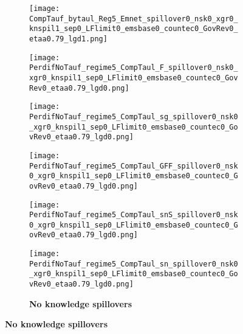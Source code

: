  \begin{figure}[h!!]
	\centering
	\caption{Effect of a constant carbon tax in model variations }\label{fig:Leveltauf_nsk0_xgr0_noknow}	
	\begin{subfigure}{0.75\textwidth}
		\caption{\textbf{No knowledge spillovers}}
	\begin{minipage}[]{0.32\textwidth}
	\texttt{[image: CompTauf\_bytaul\_Reg5\_Emnet\_spillover0\_nsk0\_xgr0\_knspil1\_sep0\_LFlimit0\_emsbase0\_countec0\_GovRev0\_etaa0.79\_lgd1.png]}
\end{minipage}	
\begin{minipage}[]{0.32\textwidth}
	\texttt{[image: PerdifNoTauf\_regime5\_CompTaul\_F\_spillover0\_nsk0\_xgr0\_knspil1\_sep0\_LFlimit0\_emsbase0\_countec0\_GovRev0\_etaa0.79\_lgd0.png]}
\end{minipage}
\begin{minipage}[]{0.32\textwidth}
\texttt{[image: PerdifNoTauf\_regime5\_CompTaul\_sg\_spillover0\_nsk0\_xgr0\_knspil1\_sep0\_LFlimit0\_emsbase0\_countec0\_GovRev0\_etaa0.79\_lgd0.png]}
\end{minipage}
\begin{minipage}[]{0.32\textwidth}
	\texttt{[image: PerdifNoTauf\_regime5\_CompTaul\_GFF\_spillover0\_nsk0\_xgr0\_knspil1\_sep0\_LFlimit0\_emsbase0\_countec0\_GovRev0\_etaa0.79\_lgd0.png]}
\end{minipage}
\begin{minipage}[]{0.32\textwidth}
\texttt{[image: PerdifNoTauf\_regime5\_CompTaul\_snS\_spillover0\_nsk0\_xgr0\_knspil1\_sep0\_LFlimit0\_emsbase0\_countec0\_GovRev0\_etaa0.79\_lgd0.png]}
\end{minipage}
\begin{minipage}[]{0.32\textwidth}
\texttt{[image: PerdifNoTauf\_regime5\_CompTaul\_sn\_spillover0\_nsk0\_xgr0\_knspil1\_sep0\_LFlimit0\_emsbase0\_countec0\_GovRev0\_etaa0.79\_lgd0.png]}
\end{minipage}
	\end{subfigure}


\end{figure}
